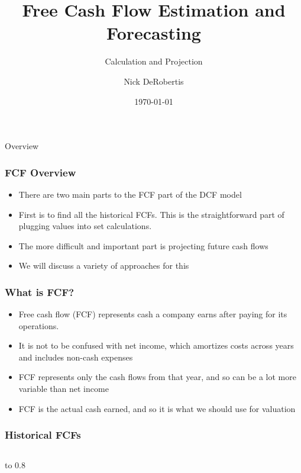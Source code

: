 \documentclass[handout, 11pt]{beamer}
\institute[UF]{\inst{1}
University of Florida\\
Department of Finance, Insurance, and Real Estate}
\begin{document}
\title[FCF]{Free Cash Flow Estimation and Forecasting}
\subtitle{Calculation and Projection}
\author[DeRobertis]{Nick DeRobertis}
\date{\today}
\begin{frame}
\titlepage
\label{title-frame}
\end{frame}
\begin{section}{Overview}
\begin{frame}
\frametitle{FCF Overview}
\begin{itemize}
\item There are two main parts to the FCF part of the DCF model
\vfill
\item First is to find all the historical FCFs. This is the straightforward part of plugging values into set calculations.
\vfill
\item The more difficult and important part is projecting future cash flows
\vfill
\item We will discuss a variety of approaches for this
\end{itemize}
\end{frame}
\begin{frame}
\frametitle{What is FCF?}
\begin{itemize}
\item Free cash flow (FCF) represents cash a company earns after paying for its operations.
\vfill
\item It is not to be confused with net income, which amortizes costs across years and includes non-cash expenses
\vfill
\item FCF represents only the cash flows from that year, and so can be a lot more variable than net income
\vfill
\item FCF is the actual cash earned, and so it is what we should use for valuation
\end{itemize}
\end{frame}
\begin{frame}
\frametitle{Historical FCFs}
\begin{columns}
\begin{column}{0.5\textwidth}
\vbox to 0.8
\end{column}
\end{columns}
\end{frame}
\end{section}
\end{document}
